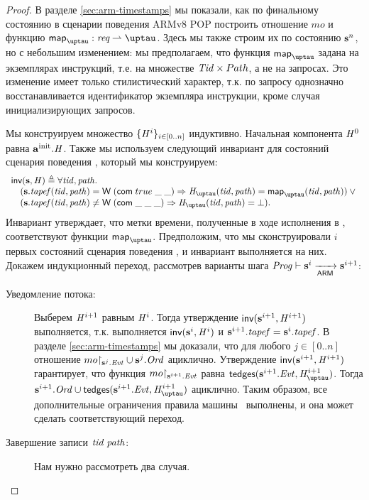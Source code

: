 \begin{proof}
  В разделе \ref{sec:arm-timestamps} мы показали, как по финальному состоянию в
  сценарии поведения ARMv8 POP построить отношение $mo$ и функцию
  $\taumapping : \Request \rightharpoonup \tau$.
  Здесь мы также строим их по состоянию $\mathbf{s}^n$, но с небольшим изменением:
  мы предполагаем, что  функция $\taumapping$ задана на экземплярах инструкций,
  т.е. на множестве $\mathit{Tid} \times Path$, а не на запросах.
  Это изменение имеет только стилистический характер, т.к. по запросу
  однозначно восстанавливается идентификатор экземпляра инструкции,
  кроме случая инициализирующих запросов.

  Мы конструируем множество $\{\mathit{H}^i \}_{i \in [0..n]}$ индуктивно.
  Начальная компонента $\mathit{H}^0$ равна $\mathbf{a}^{\rm init}.\mathit{H}$.
  Также мы используем следующий инвариант для состояний сценария поведения \ARMt,
  который мы конструируем:
  \[\begin{array}{l}
  \invTT(\s, \hmap) \triangleq \forall \tId, \cpath. \\
  \quad (\s.\tapef(\tId, \cpath) = \tapeWrite{(\tapeWriteCommitted{true}{\_}{\_})} \Rightarrow
         \tmap(\tId, \cpath) = \taumapping(\tId, \cpath)) \lor {} \\
  \quad (\s.\tapef(\tId, \cpath) \not = \tapeWrite{(\tapeWriteCommitted{\_}{\_}{\_})} \Rightarrow
         \tmap(\tId, \cpath) = \bot).
  \end{array}\]
  Инвариант утверждает, что метки времени, полученные в ходе исполнения в \ARMt,
  соответствуют функции $\taumapping$. 
  Предположим, что мы сконструировали $i$ первых состояний сценария поведения \ARMt,
  и инвариант выполняется на них.
  Докажем индукционный переход, рассмотрев варианты шага $\mathit{Prog} \vdash \mathbf{s}^i \xrightarrow[\mathsf{ARM}]{} \mathbf{s}^{i + 1}$:
  \begin{description}
  \item[Уведомление потока:]
    Выберем $\mathit{H}^{i + 1}$ равным $\mathit{H}^{i}$. 
    Тогда утверждение $\textsf{inv}(\mathbf{s}^{i + 1}, \mathit{H}^{i + 1})$ выполняется, т.к.
    выполняется $\textsf{inv}(\mathbf{s}^{i}, \mathit{H}^{i})$ и
    $\mathbf{s}^{i + 1}.\mathit{tapef} = \mathbf{s}^{i}.\mathit{tapef}$.
    В разделе \ref{sec:arm-timestamps} мы доказали, что
    для любого $j \in [0..n]$ отношение $mo{\restriction_{\mathbf{s}^j.\mathit{Evt}}} \cup \mathbf{s}^j.\mathit{Ord}$ ациклично.
    Утверждение $\textsf{inv}(\mathbf{s}^{i + 1}, \mathit{H}^{i + 1})$ гарантирует, что
    функция $mo{\restriction_{\mathbf{s}^{i+1}.\mathit{Evt}}}$ равна $\moTau(\s^{i+1}.\Evt, \tmap^{i+1})$.
    Тогда $\s^{i+1}.\Ord \cup \moTau(\s^{i+1}.\Evt, \tmap^{i+1})$ ациклично.
    Таким образом, все дополнительные ограничения правила 
    машины \ARMt~выполнены, и она может сделать соответствующий переход.
  \item[Завершение записи $\mathit{tid} \; \mathit{path}$:]
    Нам нужно рассмотреть два случая.
    

\end{description}
\end{proof}
